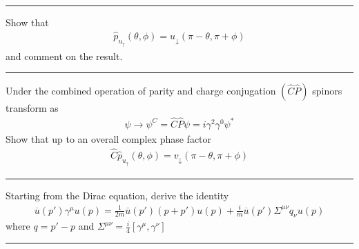 \noindent\rule{7in}{1.5pt}


\begin{problem}{4.13}
Show that
\begin{align*}
    \hat{p}_{u_\uparrow} \left( \theta,\phi \right) = u_\downarrow \left( \pi-\theta,\pi+\phi \right)
\end{align*}
and comment on the result.
\end{problem}
\begin{solution}

\end{solution}

\noindent\rule{7in}{1.5pt}


\begin{problem}{4.14}
Under the combined operation of parity and charge conjugation $(\hat{C}\hat{P})$ spinors transform as
\begin{align*}
    \psi \to \psi^C = \hat{C}\hat{P} \psi = i \gamma^2\gamma^0 \psi^\ast 
\end{align*}
Show that up to an overall complex phase factor
\begin{align*}
    \hat{C}\hat{p}_{u_\uparrow} \left( \theta,\phi \right) = v_\downarrow  \left( \pi-\theta,\pi+\phi \right)
\end{align*}
\end{problem}
\begin{solution}

\end{solution}

\noindent\rule{7in}{1.5pt}


\begin{problem}{4.15}
Starting from the Dirac equation, derive the identity
\begin{align*}
    \overbar{u}  (p') \gamma^\mu u ( p ) = \frac{1}{2m} \overbar{u}(p') \left(p+p'\right) u(p) + \frac{i}{m} \overbar{u}\left(p'\right) \Sigma^{\mu\nu} q_\nu u(p)
\end{align*}
where $q = p'-p$ and $\Sigma^{\mu\nu}=\frac{i}{4}\left[ \gamma^\mu,\gamma^\nu \right]$
\end{problem}
\begin{solution}

\end{solution}

\noindent\rule{7in}{1.5pt}


